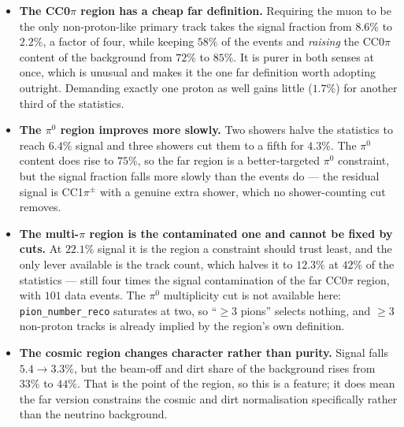 \documentclass[11pt,a4paper]{article}
\begin{document}
\begin{itemize}\itemsep2pt
  \item \textbf{The CC0$\pi$ region has a cheap far definition.} Requiring the muon to be the only
    non-proton-like primary track takes the signal fraction from $8.6\%$ to $2.2\%$, a factor of
    four, while keeping $58\%$ of the events and \emph{raising} the CC0$\pi$ content of the
    background from $72\%$ to $85\%$. It is purer in both senses at once, which is unusual and
    makes it the one far definition worth adopting outright. Demanding exactly one proton as well
    gains little ($1.7\%$) for another third of the statistics.
  \item \textbf{The $\pi^0$ region improves more slowly.} Two showers halve the statistics to reach
    $6.4\%$ signal and three showers cut them to a fifth for $4.3\%$. The $\pi^0$ content does rise
    to $75\%$, so the far region is a better-targeted $\pi^0$ constraint, but the signal fraction
    falls more slowly than the events do --- the residual signal is CC1$\pi^\pm$ with a genuine
    extra shower, which no shower-counting cut removes.
  \item \textbf{The multi-$\pi$ region is the contaminated one and cannot be fixed by cuts.} At
    $22.1\%$ signal it is the region a constraint should trust least, and the only lever available
    is the track count, which halves it to $12.3\%$ at $42\%$ of the statistics --- still four times
    the signal contamination of the far CC0$\pi$ region, with $101$ data events. The $\pi^0$
    multiplicity cut is not available here: \texttt{pion\_number\_reco} saturates at two, so
    ``$\geq3$ pions'' selects nothing, and $\geq3$ non-proton tracks is already implied by the
    region's own definition.
  \item \textbf{The cosmic region changes character rather than purity.} Signal falls $5.4\to3.3\%$,
    but the beam-off and dirt share of the background rises from $33\%$ to $44\%$. That is the point
    of the region, so this is a feature; it does mean the far version constrains the cosmic and dirt
    normalisation specifically rather than the neutrino background.
\end{itemize}
\end{document}
